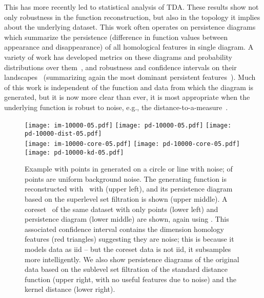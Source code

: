 \documentclass[11pt]{myclass}
\begin{document}
This has more recently led to statistical analysis of TDA.  These results show not only robustness in the function reconstruction, but also in the topology it implies about the underlying dataset.  This work often operates on persistence diagrams which summarize the persistence (difference in function values between appearance and disappearance) of all homological features in single diagram.  A variety of work has developed metrics on these diagrams and probability distributions over them~\cite{MMH11,TMMH14}, and robustness and confidence intervals on their landscapes~\cite{Bub14,FLRWBS14,CFLRSW13} (summarizing again the most dominant persistent features~\cite{CFLRW14}).  Much of this work is independent of the function and data from which the diagram is generated, but it is now more clear than ever, it is most appropriate when the underlying function is robust to noise, e.g., the distance-to-a-measure~\cite{ChazalCohen-SteinerMerigot2011}.  

\begin{figure}[h!]
\texttt{[image: im-10000-05.pdf]}
\hspace{0.01\linewidth}
\texttt{[image: pd-10000-05.pdf]}
\hspace{0.01\linewidth}
\texttt{[image: pd-10000-dist-05.pdf]}
\vspace{-.11in}
\\
\texttt{[image: im-10000-core-05.pdf]}
\hspace{0.01\linewidth}
\texttt{[image: pd-10000-core-05.pdf]}
\hspace{0.01\linewidth}
\texttt{[image: pd-10000-kd-05.pdf]}
\vspace{-.11in}
\caption{\label{fig:circleline}
\small \sffamily 
Example with  points in  generated on a circle or line with  noise;  of points are uniform background noise.  The generating function is reconstructed with \kde\ with  (upper left), and its persistence diagram based on the superlevel set filtration is shown (upper middle).  
A coreset~\cite{big-kde} of the same dataset with only  points (lower left) and persistence diagram (lower middle) are shown, again using \kde.  This associated confidence interval contains the dimension  homology features (red triangles) suggesting they are noise; this is because it models data as iid -- but the coreset data is not iid, it subsamples more intelligently.   
We also show persistence diagrams of the original data based on the sublevel set filtration of the standard distance function (upper right, with no useful features due to noise) and the kernel distance (lower right).}
\end{figure}
\end{document}
